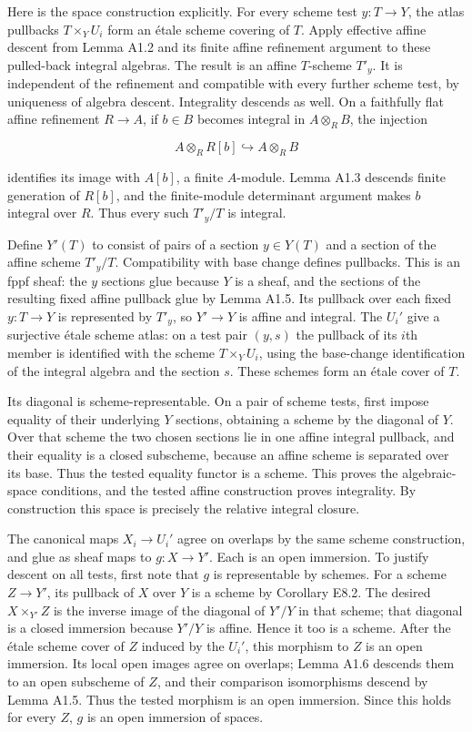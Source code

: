 \documentclass[11pt,a4paper,openany]{report}
\begin{document}
Here is the space construction explicitly. For every scheme test \(y:T\to Y\), the atlas pullbacks \(T\times_Y U_i\) form an étale scheme covering of \(T\). Apply effective affine descent from Lemma A1.2 and its finite affine refinement argument to these pulled-back integral algebras. The result is an affine \(T\)-scheme \(T'_y\). It is independent of the refinement and compatible with every further scheme test, by uniqueness of algebra descent. Integrality descends as well. On a faithfully flat affine refinement \(R\to A\), if \(b\in B\) becomes integral in \(A\otimes_R B\), the injection

\[
A\otimes_R R[b]\hookrightarrow A\otimes_R B
\]

identifies its image with \(A[b]\), a finite \(A\)-module. Lemma A1.3 descends finite generation of \(R[b]\), and the finite-module determinant argument makes \(b\) integral over \(R\). Thus every such \(T'_y/T\) is integral.

Define \(Y'(T)\) to consist of pairs of a section \(y\in Y(T)\) and a section of the affine scheme \(T'_y/T\). Compatibility with base change defines pullbacks. This is an fppf sheaf: the \(y\) sections glue because \(Y\) is a sheaf, and the sections of the resulting fixed affine pullback glue by Lemma A1.5. Its pullback over each fixed \(y:T\to Y\) is represented by \(T'_y\), so \(Y'\to Y\) is affine and integral. The \(U_i'\) give a surjective étale scheme atlas: on a test pair \((y,s)\) the pullback of its \(i\)th member is identified with the scheme \(T\times_Y U_i\), using the base-change identification of the integral algebra and the section \(s\). These schemes form an étale cover of \(T\).

Its diagonal is scheme-representable. On a pair of scheme tests, first impose equality of their underlying \(Y\) sections, obtaining a scheme by the diagonal of \(Y\). Over that scheme the two chosen sections lie in one affine integral pullback, and their equality is a closed subscheme, because an affine scheme is separated over its base. Thus the tested equality functor is a scheme. This proves the algebraic-space conditions, and the tested affine construction proves integrality. By construction this space is precisely the relative integral closure.

The canonical maps \(X_i\to U_i'\) agree on overlaps by the same scheme construction, and glue as sheaf maps to \(g:X\to Y'\). Each is an open immersion. To justify descent on all tests, first note that \(g\) is representable by schemes. For a scheme \(Z\to Y'\), its pullback of \(X\) over \(Y\) is a scheme by Corollary E8.2. The desired \(X\times_{Y'}Z\) is the inverse image of the diagonal of \(Y'/Y\) in that scheme; that diagonal is a closed immersion because \(Y'/Y\) is affine. Hence it too is a scheme. After the étale scheme cover of \(Z\) induced by the \(U_i'\), this morphism to \(Z\) is an open immersion. Its local open images agree on overlaps; Lemma A1.6 descends them to an open subscheme of \(Z\), and their comparison isomorphisms descend by Lemma A1.5. Thus the tested morphism is an open immersion. Since this holds for every \(Z\), \(g\) is an open immersion of spaces.
\end{document}
